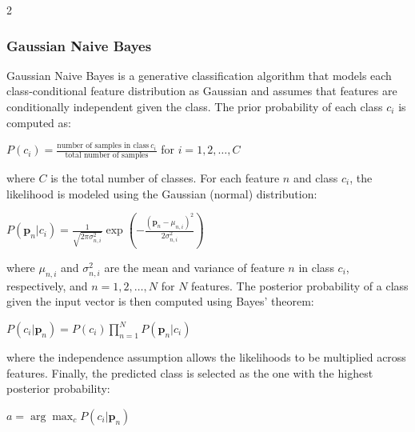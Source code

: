 \documentclass[bst/sn-nature]{sn-jnl}
\begin{document}
\begin{multicols}{2}
\subsubsection{Gaussian Naive Bayes\cite{naivebayes}}

\quad Gaussian Naive Bayes is a generative classification algorithm that models each class-conditional feature distribution as Gaussian and assumes that features are conditionally independent given the class. The prior probability of each class $c_i$ is computed as: \\ 

\begin{center}
    $P(c_{i}) = \frac{\text{number of samples in class} \ c_{i}}{ \text{total number of samples}}$ \quad for $i = 1, 2, \dots, C$ \vspace{0.3cm}
\end{center}

where $C$ is the total number of classes. For each feature $n$ and class $c_i$, the likelihood is modeled using the Gaussian (normal) distribution: \\

\begin{center}
    $P(\mathbf{p}_{n}|c_i) = \frac{1}{\sqrt{2 \pi \sigma^{2}_{n,i}}} \exp\left(-\frac{(\mathbf{p}_n - \mu_{n,i})^2}{2 \sigma^{2}_{n,i}}\right)$ \vspace{0.3cm}
\end{center}

where $\mu_{n,i}$ and $\sigma^2_{n,i}$ are the mean and variance of feature $n$ in class $c_i$, respectively, and $n = 1, 2, \dots, N$ for $N$ features. The posterior probability of a class given the input vector is then computed using Bayes’ theorem: \\ 

\begin{center}
    $P(c_i|\mathbf{p}_{n}) = P(c_i) \prod^{N}_{n=1} P(\mathbf{p}_{n}|c_i)$ \vspace{0.3cm}
\end{center}

where the independence assumption allows the likelihoods to be multiplied across features. Finally, the predicted class is selected as the one with the highest posterior probability: \\

\begin{center}
    $a = \arg\max_c P(c_i|\mathbf{p}_{n})$ \vspace{0.3cm}
\end{center}


\end{multicols}
\end{document}
